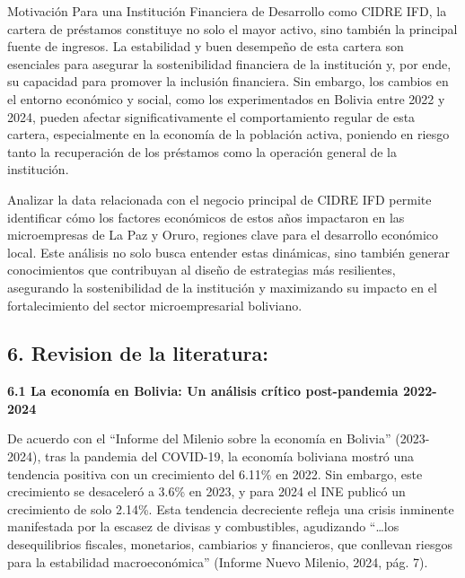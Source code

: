\documentclass[Royal,times,sageh]{sagej}
\begin{document}
Motivación Para una Institución Financiera de Desarrollo como CIDRE IFD,
la cartera de préstamos constituye no solo el mayor activo, sino también
la principal fuente de ingresos. La estabilidad y buen desempeño de esta
cartera son esenciales para asegurar la sostenibilidad financiera de la
institución y, por ende, su capacidad para promover la inclusión
financiera. Sin embargo, los cambios en el entorno económico y social,
como los experimentados en Bolivia entre 2022 y 2024, pueden afectar
significativamente el comportamiento regular de esta cartera,
especialmente en la economía de la población activa, poniendo en riesgo
tanto la recuperación de los préstamos como la operación general de la
institución.

Analizar la data relacionada con el negocio principal de CIDRE IFD
permite identificar cómo los factores económicos de estos años
impactaron en las microempresas de La Paz y Oruro, regiones clave para
el desarrollo económico local. Este análisis no solo busca entender
estas dinámicas, sino también generar conocimientos que contribuyan al
diseño de estrategias más resilientes, asegurando la sostenibilidad de
la institución y maximizando su impacto en el fortalecimiento del sector
microempresarial boliviano.

\subsection{\texorpdfstring{6. \textbf{Revision de la
literatura:}}{6. Revision de la literatura:}}\label{revision-de-la-literatura}

\textbf{6.1 La economía en Bolivia: Un análisis crítico post-pandemia
2022-2024}

De acuerdo con el ``Informe del Milenio sobre la economía en Bolivia''
(2023-2024), tras la pandemia del COVID-19, la economía boliviana mostró
una tendencia positiva con un crecimiento del 6.11\% en 2022. Sin
embargo, este crecimiento se desaceleró a 3.6\% en 2023, y para 2024 el
INE publicó un crecimiento de solo 2.14\%. Esta tendencia decreciente
refleja una crisis inminente manifestada por la escasez de divisas y
combustibles, agudizando ``\ldots los desequilibrios fiscales,
monetarios, cambiarios y financieros, que conllevan riesgos para la
estabilidad macroeconómica'' (Informe Nuevo Milenio, 2024, pág. 7).
\end{document}
